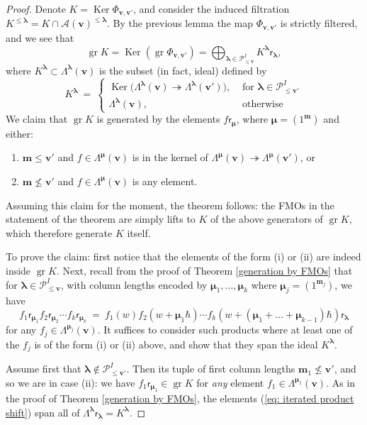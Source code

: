\documentclass[11pt,reqno]{amsart}
\renewcommand{\mathbf}{\mathbold}
\numberwithin{equation}{section}
\theoremstyle{definition}
\newcommand{\cA}{\mathcal{A}}
\newcommand{\cP}{\mathcal{P}}
\newcommand{\bm}{\mathbf{m}}
\newcommand{\bv}{\mathbf{v}}
\DeclareMathOperator{\gr}{gr}
\renewcommand{\bv}{\mathbf{v}} %
\newcommand{\sfr}{{\mathsf{r}}}
\newcommand{\vertexset}{I}
\newcommand{\GT}{\Lambda}
\newcommand{\Partitions}{\cP}
\newcommand{\bla}{{\boldsymbol{\lambda}}}
\newcommand{\bmu}{{\boldsymbol{\mu}}}
\newcommand{\qzast}{\cA}
\begin{document}
\begin{proof}
Denote $K = \operatorname{Ker} \Phi_{\bv,\bv'}$, and consider the induced filtration
$K^{\leq \bla} = K \cap \qzast(\bv)^{\leq \bla}$. By the previous lemma the map $\Phi_{\bv,\bv'}$ is strictly filtered, and we see that
$$
\gr K = \operatorname{Ker}( \gr \Phi_{\bv, \bv'} ) = \bigoplus_{\bla \in \Partitions_{\leq \bv}^\vertexset} K^\bla \sfr_\bla,
$$
where $K^\bla \subset \GT^{\bla}(\bv)$ is the subset (in fact, ideal) defined by
\begin{equation}
K^\bla \ = \ \left\{ \begin{array}{cl} \operatorname{Ker}\big( \GT^{\bla}(\bv) \twoheadrightarrow \GT^{\bla}(\bv')\big), & \text{ for } \bla \in \Partitions_{\leq \bv'}^\vertexset \\  \GT^{\bla}(\bv), & \text{ otherwise } \end{array} \right.
\end{equation}
We claim that $\gr K$ is generated by the elements $f \sfr_{\bmu}$, where $\bmu = (1^\bm)$ and either:
\begin{enumerate}[label=(\roman*)]
\item $\bm \leq \bv'$ and $f \in \GT^{\bmu}(\bv)$ is in the kernel of $ \GT^{\bmu}(\bv) \twoheadrightarrow \GT^{\bmu}(\bv')$, or
\item  $\bm \not\leq \bv'$ and $f\in \GT^{\bmu}(\bv)$ is any element.
\end{enumerate}
Assuming this claim for the moment, the theorem follows: the FMOs in the statement of the theorem are simply lifts to $K$ of the above generators of $\gr K$, which therefore generate $K$ itself.

To prove the claim: first notice that the elements of the form (i) or (ii) are indeed inside $\gr K$.  Next, recall from the proof of Theorem \ref{generation by FMOs} that for $\bla \in \Partitions_{\leq \bv}^\vertexset$, with column lengths encoded by $\bmu_1,\ldots, \bmu_k$ where $\bmu_j = (1^{\bm_j})$, we have
\begin{equation}
\label{eq: iterated product shift}
f_1\sfr_{\bmu_1}  f_2 \sfr_{\bmu_2} \cdots f_k\sfr_{\bmu_k}  \ = \ f_1(w)  f_2(w + \bmu_1 \hbar) \cdots f_k(w + (\bmu_1+\ldots + \bmu_{k-1})\hbar) \sfr_\bla
\end{equation}
for any $f_j \in \GT^{\bmu_j}(\bv)$.  It suffices to consider such products where at least one of the $f_j$ is of the form (i) or (ii) above, and show that they span the ideal $K^\bla$.

Assume first that $\bla \notin \Partitions_{\leq \bv'}^\vertexset$.  Then its tuple of first column lengths $\bm_1 \not\leq \bv'$, and so we are in case (ii): we have $f_1 \sfr_{\bmu_1} \in \gr K$ for \emph{any} element $f_1 \in \GT^{\bmu_1}(\bv)$. As in the proof of Theorem \ref{generation by FMOs}, the elements (\ref{eq: iterated product shift}) span all of $\GT^{\bla} \sfr_\bla = K^\bla$.


\end{proof}
\end{document}
